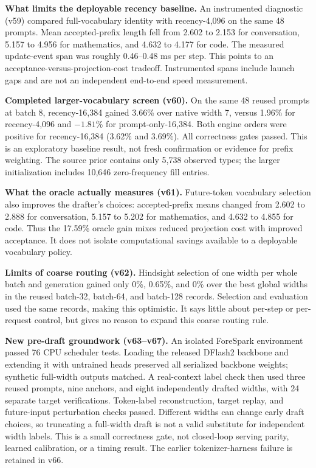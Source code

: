 \documentclass[10pt]{article}
\begin{document}
\textbf{What limits the deployable recency baseline.} An instrumented diagnostic (v59) compared full-vocabulary identity with recency-4,096 on the same 48 prompts. Mean accepted-prefix length fell from 2.602 to 2.153 for conversation, 5.157 to 4.956 for mathematics, and 4.632 to 4.177 for code. The measured update-event span was roughly 0.46--0.48 ms per step. This points to an acceptance-versus-projection-cost tradeoff. Instrumented spans include launch gaps and are not an independent end-to-end speed measurement.

\textbf{Completed larger-vocabulary screen (v60).} On the same 48 reused prompts at batch 8, recency-16,384 gained 3.66\% over native width 7, versus 1.96\% for recency-4,096 and $-1.81$\% for prompt-only-16,384. Both engine orders were positive for recency-16,384 (3.62\% and 3.69\%). All correctness gates passed. This is an exploratory baseline result, not fresh confirmation or evidence for prefix weighting. The source prior contains only 5,738 observed types; the larger initialization includes 10,646 zero-frequency fill entries.

\textbf{What the oracle actually measures (v61).} Future-token vocabulary selection also improves the drafter's choices: accepted-prefix means changed from 2.602 to 2.888 for conversation, 5.157 to 5.202 for mathematics, and 4.632 to 4.855 for code. Thus the 17.59\% oracle gain mixes reduced projection cost with improved acceptance. It does not isolate computational savings available to a deployable vocabulary policy.

\textbf{Limits of coarse routing (v62).} Hindsight selection of one width per whole batch and generation gained only 0\%, 0.65\%, and 0\% over the best global widths in the reused batch-32, batch-64, and batch-128 records. Selection and evaluation used the same records, making this optimistic. It says little about per-step or per-request control, but gives no reason to expand this coarse routing rule.

\textbf{New pre-draft groundwork (v63--v67).} An isolated ForeSpark environment passed 76 CPU scheduler tests. Loading the released DFlash2 backbone and extending it with untrained heads preserved all serialized backbone weights; synthetic full-width outputs matched. A real-context label check then used three reused prompts, nine anchors, and eight independently drafted widths, with 24 separate target verifications. Token-label reconstruction, target replay, and future-input perturbation checks passed. Different widths can change early draft choices, so truncating a full-width draft is not a valid substitute for independent width labels. This is a small correctness gate, not closed-loop serving parity, learned calibration, or a timing result. The earlier tokenizer-harness failure is retained in v66.
\end{document}
